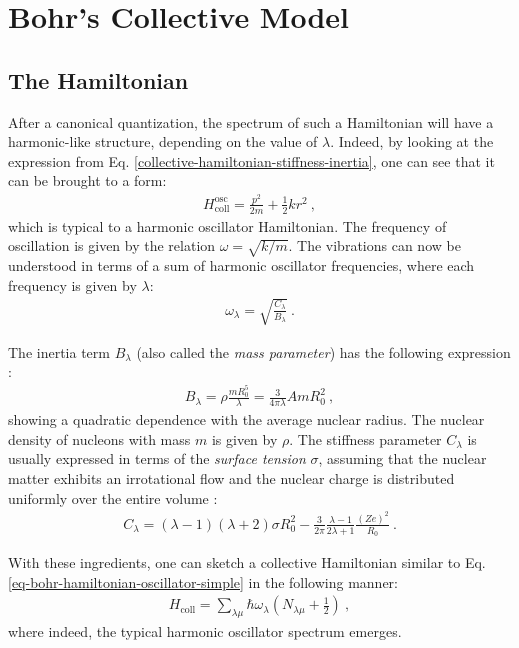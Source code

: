 \chapter{Bohr's Collective Model}
\label{appendix:bohr-model}

\section{The Hamiltonian}
After a canonical quantization, the spectrum of such a Hamiltonian will have a harmonic-like structure, depending on the value of $\lambda$. Indeed, by looking at the expression from Eq. \ref{collective-hamiltonian-stiffness-inertia}, one can see that it can be brought to a form:
\begin{align}
    H_\text{coll}^\text{osc}=\frac{p^2}{2m}+\frac{1}{2}kr^2\ ,
    \label{eq-bohr-hamiltonian-oscillator-simple}
\end{align}
which is typical to a harmonic oscillator Hamiltonian. The frequency of oscillation is given by the relation $\omega=\sqrt{k/m}$. The vibrations can now be understood in terms of a sum of harmonic oscillator frequencies, where each frequency is given by $\lambda$:
\begin{align}
\omega_\lambda=\sqrt{\frac{C_\lambda}{B_\lambda}}\ .
\end{align}

The inertia term $B_\lambda$ (also called the \emph{mass parameter}) has the following expression \cite{ring2004nuclear}:
\begin{align}
    B_\lambda=\rho \frac{mR_0^5}{\lambda}=\frac{3}{4\pi\lambda}AmR_0^2\ ,
    \label{inertia-parameters-B}
\end{align}
showing a quadratic dependence with the average nuclear radius. The nuclear density of nucleons with mass $m$ is given by $\rho$. The stiffness parameter $C_\lambda$ is usually expressed in terms of the \emph{surface tension} $\sigma$, assuming that the nuclear matter exhibits an irrotational flow and the nuclear charge is distributed uniformly over the entire volume \cite{ring2004nuclear}:
\begin{align}
    C_\lambda=(\lambda-1)(\lambda+2)\sigma R_0^2-\frac{3}{2\pi}\frac{\lambda-1}{2\lambda+1}\frac{(Ze)^2}{R_0}\ .
    \label{stiffness-parameters-C}
\end{align}

With these ingredients, one can sketch a collective Hamiltonian similar to Eq. \ref{eq-bohr-hamiltonian-oscillator-simple} in the following manner:
\begin{align}
    H_\text{coll}=\sum_{\lambda\mu}\hbar\omega_\lambda\left(N_{\lambda\mu}+\frac{1}{2}\right)\ ,
\end{align}
where indeed, the typical harmonic oscillator spectrum emerges. 

